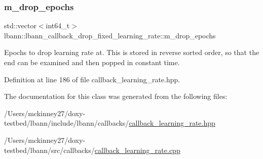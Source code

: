 \subsubsection{\texorpdfstring{m\+\_\+drop\+\_\+epochs}{m\_drop\_epochs}}
{\footnotesize\ttfamily std\+::vector$<$int64\+\_\+t$>$ lbann\+::lbann\+\_\+callback\+\_\+drop\+\_\+fixed\+\_\+learning\+\_\+rate\+::m\+\_\+drop\+\_\+epochs\hspace{0.3cm}{\ttfamily [private]}}

Epochs to drop learning rate at. This is stored in reverse sorted order, so that the end can be examined and then popped in constant time. 

Definition at line 186 of file callback\+\_\+learning\+\_\+rate.\+hpp.



The documentation for this class was generated from the following files\+:\begin{DoxyCompactItemize}
\item 
/\+Users/mckinney27/doxy-\/testbed/lbann/include/lbann/callbacks/\hyperlink{callback__learning__rate_8hpp}{callback\+\_\+learning\+\_\+rate.\+hpp}\item 
/\+Users/mckinney27/doxy-\/testbed/lbann/src/callbacks/\hyperlink{callback__learning__rate_8cpp}{callback\+\_\+learning\+\_\+rate.\+cpp}\end{DoxyCompactItemize}
